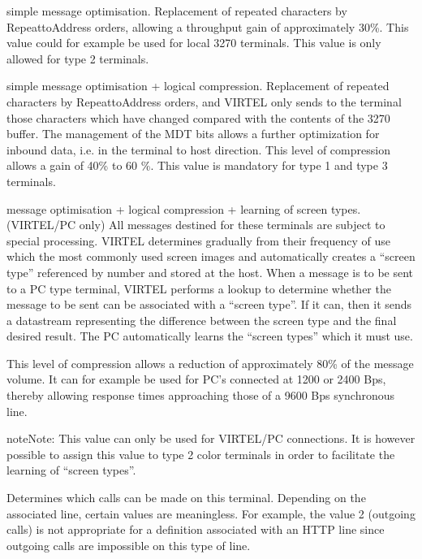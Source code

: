 \documentclass[letterpaper,10pt,english]{sphinxmanual}
\begin{document}
\begin{description}
\begin{description}
\sphinxAtStartPar
simple message optimisation.
Replacement of repeated characters by Repeat\sphinxhyphen{}to\sphinxhyphen{}Address orders, allowing a throughput gain of approximately 30\%. This value could for example be used for local 3270 terminals.
This value is only allowed for type 2 terminals.

\sphinxAtStartPar
simple message optimisation + logical compression.
Replacement of repeated characters by Repeat\sphinxhyphen{}to\sphinxhyphen{}Address orders, and VIRTEL only sends to the terminal those characters which have changed compared with the contents of the 3270 buffer. The management of the MDT bits allows a further
optimization for inbound data, i.e. in the terminal to host direction. This level of compression allows a gain of 40\% to 60 \%. This value is mandatory for type 1 and type 3 terminals.

\sphinxAtStartPar
message optimisation + logical compression + learning of screen types. (VIRTEL/PC only)
All messages destined for these terminals are subject to special processing. VIRTEL determines gradually from their frequency of use which the most commonly used screen images and automatically creates a “screen type” referenced by number and stored at the host. When a message is to be sent to a PC type terminal, VIRTEL performs a lookup to determine whether the message to be sent can be associated with a “screen type”. If it can, then it sends a datastream representing the difference between the screen type and the final desired result. The PC automatically learns the “screen types” which it must use.

\end{description}

\sphinxAtStartPar
This level of compression allows a reduction of approximately 80\% of the message volume. It can for example be used for PC’s connected at 1200 or 2400 Bps, thereby allowing response times approaching those of a 9600 Bps synchronous line.

\begin{sphinxadmonition}{note}{Note:}
\sphinxAtStartPar
This value can only be used for VIRTEL/PC connections. It is however possible to assign this value to type 2 color terminals in order to facilitate the learning of “screen types”.
\end{sphinxadmonition}

\sphinxAtStartPar
Determines which calls can be made on this terminal. Depending on the associated line, certain values are meaningless. For example, the value 2 (outgoing calls) is not appropriate for a definition associated with an HTTP line since outgoing calls are impossible on this type of line.


\end{description}
\end{document}
